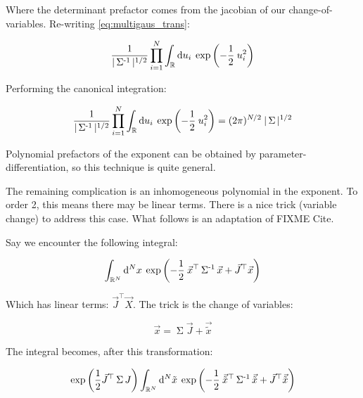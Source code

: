 \documentclass[10pt,letterpaper]{article}
\def\d{{\rm d}}  %
\begin{document}
Where the determinant prefactor comes from the jacobian of our change-of-variables. Re-writing \ref{eq:multigaus_trans}:

\begin{equation} \label{eq:multigaus_trans}
\dfrac{1}{|\operatorname{\Sigma^{-1}}|^{1/2}} \prod_{i=1}^{N} \int_{\mathbb{R}} \d u_{i} \hspace{0.2pc} \exp\left(-\dfrac{1}{2} \hspace{0.2pc} u_{i}^2\right)
\end{equation}

Performing the canonical integration:

\begin{equation} \label{eq:multigaus_final}
\dfrac{1}{|\operatorname{\Sigma^{-1}}|^{1/2}} \prod_{i=1}^{N} \int_{\mathbb{R}} \d u_{i} \hspace{0.2pc} \exp \left(-\dfrac{1}{2} \hspace{0.2pc} u_{i}^2 \right) = (2\pi)^{N/2} \hspace{0.2pc}|\operatorname{\Sigma}|^{1/2}
\end{equation}

Polynomial prefactors of the exponent can be obtained by parameter-differentiation, so this technique is quite general. 

The remaining complication is an inhomogeneous polynomial in the exponent. To order 2, this means there may be linear terms. There is a nice trick (variable change) to address this case. What follows is an adaptation of FIXME Cite.

Say we encounter the following integral:

\begin{equation} \label{eq:multigaus_linterm}
\int_{\mathbb{R}^N} \d^N x \hspace{0.2pc} \exp \left(-\dfrac{1}{2} \hspace{0.2pc}  \vec{x}^\top \operatorname{\Sigma^{-1}} \vec{x} + \vec{J}^\top \vec{x} \right)
\end{equation}

Which has linear terms: $\vec{J}^\top \vec{X}$. The trick is the change of variables:

$$\vec{x} = \operatorname{\Sigma} \vec{J} + \vec{\tilde{x}}$$

The integral becomes, after this transformation:

\begin{equation} \label{eq:multigaus_lintrick}
\exp\left(\dfrac{1}{2}\vec{J}^\top \operatorname{\Sigma} J\right) \int_{\mathbb{R}^N} \d^N \tilde{x} \hspace{0.2pc} \exp\left(-\dfrac{1}{2} \hspace{0.2pc} \vec{\tilde{x}}^\top \operatorname{\Sigma^{-1}} \vec{\tilde{x}} + {\vec{J}}^\top \vec{\tilde{x}}\right)
\end{equation}
\end{document}
